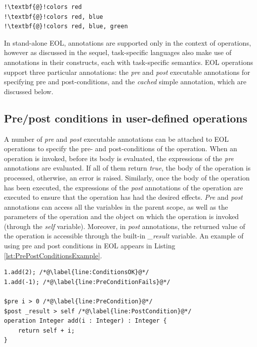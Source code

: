 \begin{lstlisting}[float=tbp, caption=Examples of simple annotations, label=lst:SimpleAnnotationsExamples, language=EOL, escapechar=!]
!\textbf{@}!colors red
!\textbf{@}!colors red, blue
!\textbf{@}!colors red, blue, green
\end{lstlisting}

In stand-alone EOL, annotations are supported only in the context of operations, however as discussed in the sequel, task-specific languages also make use of annotations in their constructs, each with task-specific semantics. EOL operations support three particular annotations: the \emph{pre} and \emph{post} executable annotations for specifying pre and post-conditions, and the \emph{cached} simple annotation, which are discussed below.

\subsection{Pre/post conditions in user-defined operations}
\label{sec:prep-cond-user}

A number of \emph{pre} and \emph{post} executable annotations can be attached to EOL operations to specify the pre- and post-conditions of the operation. When an operation is invoked, before its body is evaluated, the expressions of the \emph{pre} annotations are evaluated. If all of them return \emph{true}, the body of the operation is processed, otherwise, an error is raised. Similarly, once the body of the operation has been executed, the expressions of the \emph{post} annotations of the operation are executed to ensure that the operation has had the desired effects. \emph{Pre} and \emph{post} annotations can access all the variables in the parent scope, as well as the parameters of the operation and the object on which the operation is invoked (through the \emph{self} variable). Moreover, in \emph{post} annotations, the returned value of the operation is accessible through the built-in \emph{\_result} variable. An example of using pre and post conditions in EOL appears in Listing \ref{lst:PrePostConditionsExample}.

\begin{lstlisting}[float=tbp, caption=Example of pre- and post-conditions in an EOL operation, label=lst:PrePostConditionsExample, language=EOL]
1.add(2); /*@\label{line:ConditionsOK}@*/
1.add(-1); /*@\label{line:PreConditionFails}@*/

$pre i > 0 /*@\label{line:PreCondition}@*/
$post _result > self /*@\label{line:PostCondition}@*/
operation Integer add(i : Integer) : Integer {
	return self + i;
}
\end{lstlisting}

